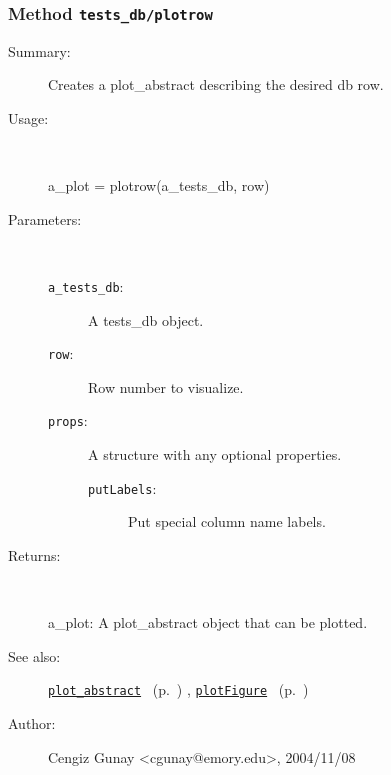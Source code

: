 \subsubsection[Method \texttt{plotrow}]{Method \texttt{tests\_db/plotrow}}%
%
\label{ref_tests_db__plotrow}%
\hypertarget{ref_tests_db__plotrow}{}%
\begin{description}
\item[Summary:]Creates a plot\_abstract describing the desired db row.
%
\item[Usage:]~%
\begin{lyxcode}%
a\_plot = plotrow(a\_tests\_db, row)
%
\end{lyxcode}%
%
%
\item[Parameters:]~
\begin{description}%
\item[\texttt{a\_tests\_db}:]
 A tests\_db object.
\item[\texttt{row}:]
 Row number to visualize.
\item[\texttt{props}:]
 A structure with any optional properties.
\begin{description}%
\item[\texttt{putLabels}:]
 Put special column name labels.
\end{description}%
\end{description}%
%
\item[Returns:]~

	a\_plot: A plot\_abstract object that can be plotted.
%
%
\item[See also:]%
\hyperlink{ref_plot_abstract}{\texttt{plot\_abstract}}%
\ (p.~\pageref{ref_plot_abstract})%
%
, \hyperlink{ref_plotFigure}{\texttt{plotFigure}}%
\ (p.~\pageref{ref_plotFigure})%
%
%
\item[Author:]%
Cengiz Gunay <cgunay@emory.edu>, 2004/11/08%
\end{description}
\methodline%
